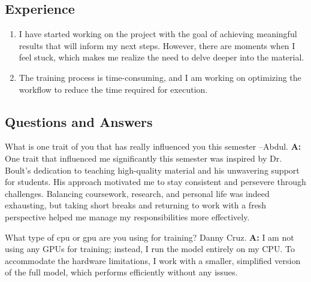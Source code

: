 \subsection*{Experience}

\begin{enumerate}
    \item I have started working on the project with the goal of achieving meaningful results that will inform my next steps. However, there are moments when I feel stuck, which makes me realize the need to delve deeper into the material.
    
    \item The training process is time-consuming, and I am working on optimizing the workflow to reduce the time required for execution.
\end{enumerate}

\subsection*{Questions and Answers}
What is one trait of you that has really influenced you this semester  --Abdul.
\textbf{A:} One trait that influenced me significantly this semester was inspired by Dr. Boult’s dedication to teaching high-quality material and his unwavering support for students. His approach motivated me to stay consistent and persevere through challenges. Balancing coursework, research, and personal life was indeed exhausting, but taking short breaks and returning to work with a fresh perspective helped me manage my responsibilities more effectively.

What type of cpu or gpu are you using for training? Danny Cruz.
\textbf{A:} I am not using any GPUs for training; instead, I run the model entirely on my CPU. To accommodate the hardware limitations, I work with a smaller, simplified version of the full model, which performs efficiently without any issues.



